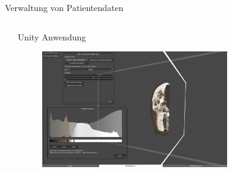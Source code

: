 \documentclass[final,hyperref={pdfpagelabels=false}]{beamer}
\begin{document}
\begin{frame}[t]
\begin{columns}[t]
\begin{column}{0.465\textwidth}
\begin{block}{Verwaltung von Patientendaten}
\end{block}


\end{column}

\begin{column}{.025\textwidth}\end{column} %

\end{columns} %



\begin{columns}[t] %

\begin{column}{.025\textwidth}\end{column} %

\begin{column}{.465\textwidth} %


\begin{block}{Unity Anwendung}
    \begin{figure}
    	\center
        \includegraphics[width=0.75\textwidth]{unityAnwendung}
        
    \end{figure}

\end{block}


\end{column} %




\end{columns}
\end{frame}
\end{document}
